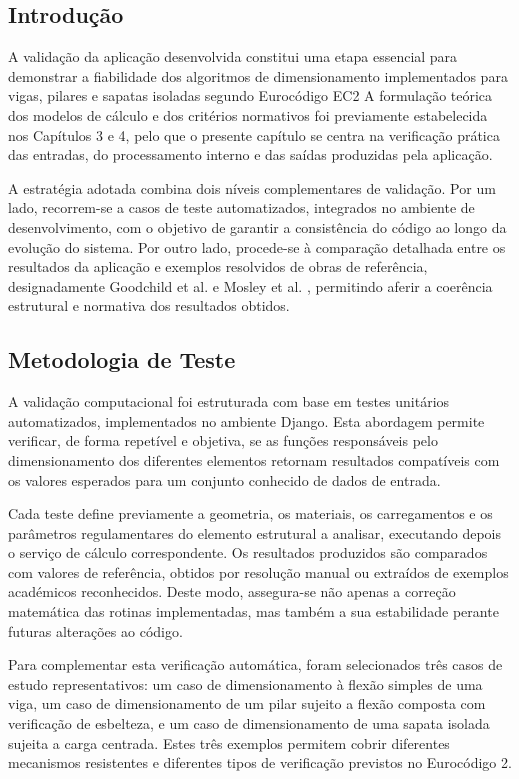 \subsection{Introdução}

A validação da aplicação desenvolvida constitui uma etapa essencial para demonstrar a fiabilidade dos algoritmos de dimensionamento implementados para vigas, pilares e sapatas isoladas segundo Eurocódigo EC2 A formulação teórica dos modelos de cálculo e dos critérios normativos foi previamente estabelecida nos Capítulos 3 e 4, pelo que o presente capítulo se centra na verificação prática das entradas, do processamento interno e das saídas produzidas pela aplicação.

A estratégia adotada combina dois níveis complementares de validação. Por um lado, recorrem-se a casos de teste automatizados, integrados no ambiente de desenvolvimento, com o objetivo de garantir a consistência do código ao longo da evolução do sistema. Por outro lado, procede-se à comparação detalhada entre os resultados da aplicação e exemplos resolvidos de obras de referência, designadamente Goodchild et al. \cite{Goodchild} e Mosley et al. \cite{Mosley}, permitindo aferir a coerência estrutural e normativa dos resultados obtidos.

\subsection{Metodologia de Teste}

A validação computacional foi estruturada com base em testes unitários automatizados, implementados no ambiente Django. Esta abordagem permite verificar, de forma repetível e objetiva, se as funções responsáveis pelo dimensionamento dos diferentes elementos retornam resultados compatíveis com os valores esperados para um conjunto conhecido de dados de entrada.

Cada teste define previamente a geometria, os materiais, os carregamentos e os parâmetros regulamentares do elemento estrutural a analisar, executando depois o serviço de cálculo correspondente. Os resultados produzidos são comparados com valores de referência, obtidos por resolução manual ou extraídos de exemplos académicos reconhecidos. Deste modo, assegura-se não apenas a correção matemática das rotinas implementadas, mas também a sua estabilidade perante futuras alterações ao código.

Para complementar esta verificação automática, foram selecionados três casos de estudo representativos: um caso de dimensionamento à flexão simples de uma viga, um caso de dimensionamento de um pilar sujeito a flexão composta com verificação de esbelteza, e um caso de dimensionamento de uma sapata isolada sujeita a carga centrada. Estes três exemplos permitem cobrir diferentes mecanismos resistentes e diferentes tipos de verificação previstos no Eurocódigo 2.

